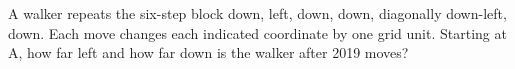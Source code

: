 A walker repeats the six-step block down, left, down, down, diagonally down-left, down. Each move changes each indicated coordinate by one grid unit. Starting at A, how far left and how far down is the walker after 2019 moves?
